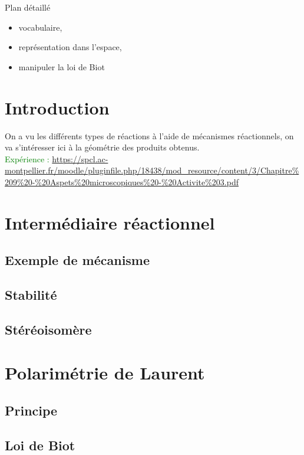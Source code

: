 \begin{reportBlock}{Plan détaillé}
\begin{itemize}
\item vocabulaire,
\item représentation dans l'espace,
\item manipuler la loi de Biot
\end{itemize}


\section*{Introduction}
On a vu les différents types de réactions à l'aide de mécanismes réactionnels, on va s'intéresser ici à la géométrie des produits obtenus.\\

\textcolor{green}{Expérience :} \url{https://spcl.ac-montpellier.fr/moodle/pluginfile.php/18438/mod_resource/content/3/Chapitre\%209\%20-\%20Aspets\%20microscopiques\%20-\%20Activite\%203.pdf}

\section{Intermédiaire réactionnel}

\subsection{Exemple de mécanisme}


\subsection{Stabilité}

\subsection{Stéréoisomère}


\section{Polarimétrie de Laurent}

\subsection{Principe}

\subsection{Loi de Biot}


\end{reportBlock}
